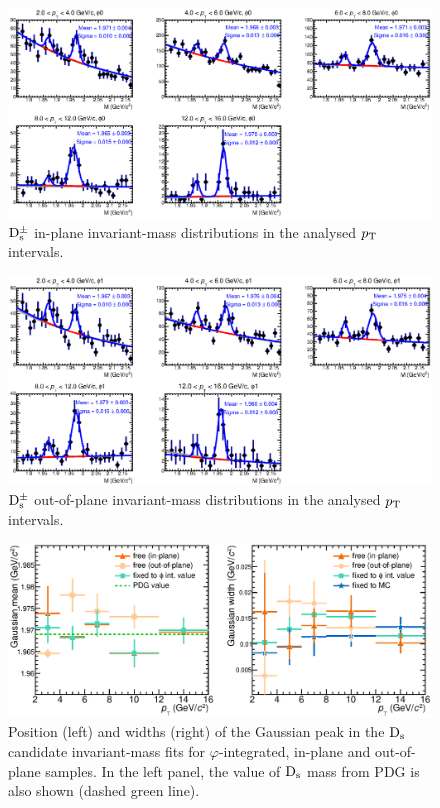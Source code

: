 \begin{figure}
\centering
 \includegraphics[width=1\textwidth]{FigCap5/InvMassDs_Phi0_3050.eps}
\caption{${\rm D_s^{\pm}}$ in-plane invariant-mass distributions in the analysed $p_{\rm T}$ intervals.}
\label{fig:deltaphi0binsds}
\end{figure}
\begin{figure}
\centering
 \includegraphics[width=1\textwidth]{FigCap5/InvMassDs_Phi1_3050.eps}
\caption{${\rm D_s^{\pm}}$ out-of-plane invariant-mass distributions in the analysed $p_{\rm T}$ intervals.}
\label{fig:deltaphi1binsds}
\end{figure}
\begin{figure}
\centering
 \includegraphics[width=.98\textwidth]{FigCap5/sigmaComparison.eps}
\caption{Position (left) and widths (right) of the Gaussian peak in the ${\rm D_s}$ candidate invariant-mass fits for $\varphi$-integrated, in-plane and out-of-plane samples. In the left panel, the value of ${\rm D_s}$ mass from PDG is also shown (dashed green line).}
\label{fig:deltaphibinsds}
\end{figure}

